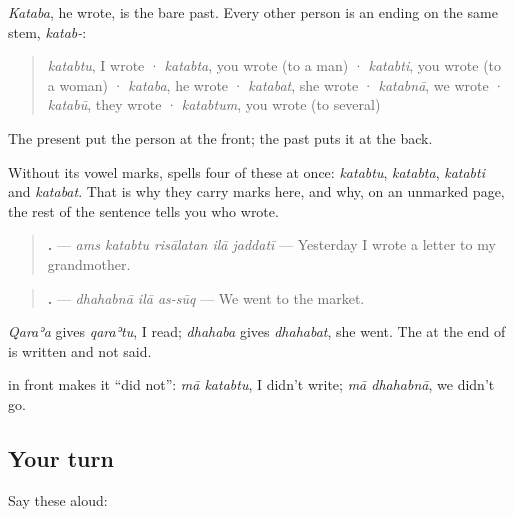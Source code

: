 \begin{grammarlens}[title={Grammar Lens: the endings at the back}]
\emph{Kataba}, he wrote, is the bare past. Every other person is an ending on the same stem, \emph{katab-}:

\begin{quote}
\textbf{} \emph{katabtu}, I wrote · \textbf{} \emph{katabta}, you wrote (to a man) · \textbf{} \emph{katabti}, you wrote (to a woman) · \textbf{} \emph{kataba}, he wrote · \textbf{} \emph{katabat}, she wrote · \textbf{} \emph{katabnā}, we wrote · \textbf{} \emph{katabū}, they wrote · \textbf{} \emph{katabtum}, you wrote (to several)
\end{quote}

The present put the person at the front; the past puts it at the back.

Without its vowel marks, \textbf{} spells four of these at once: \emph{katabtu}, \emph{katabta}, \emph{katabti} and \emph{katabat}. That is why they carry marks here, and why, on an unmarked page, the rest of the sentence tells you who wrote.
\end{grammarlens}

\begin{grammarlens}[title={Grammar Lens: other verbs, and \textquotedblleft{}did not\textquotedblright{}}]
\begin{quote}
\textbf{    .} — \emph{ams katabtu risālatan ilā jaddatī} — Yesterday I wrote a letter to my grandmother.
\end{quote}

\begin{quote}
\textbf{  .} — \emph{dhahabnā ilā as-sūq} — We went to the market.
\end{quote}

\emph{Qaraʾa} gives \emph{qaraʾtu}, I read; \emph{dhahaba} gives \emph{dhahabat}, she went. The \textbf{} at the end of \textbf{} is written and not said.

\textbf{} in front makes it \textquotedblleft{}did not\textquotedblright{}: \emph{mā katabtu}, I didn't write; \emph{mā dhahabnā}, we didn't go.
\end{grammarlens}

\subsection*{Your turn}
Say these aloud:

